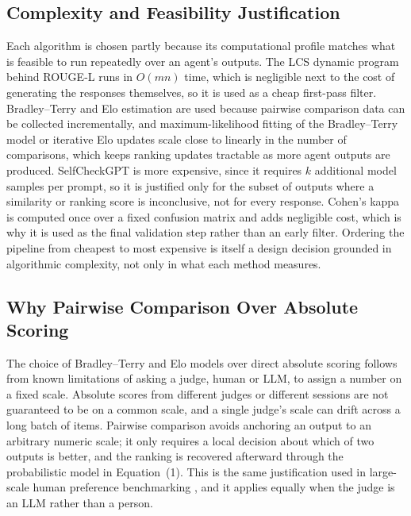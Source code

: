 \documentclass[conference]{IEEEtran}
\begin{document}
\subsection{Complexity and Feasibility Justification}
Each algorithm is chosen partly because its computational profile matches what is feasible to run repeatedly over an agent's outputs. The LCS dynamic program behind ROUGE-L runs in $O(mn)$ time, which is negligible next to the cost of generating the responses themselves, so it is used as a cheap first-pass filter. Bradley--Terry and Elo estimation are used because pairwise comparison data can be collected incrementally, and maximum-likelihood fitting of the Bradley--Terry model or iterative Elo updates scale close to linearly in the number of comparisons, which keeps ranking updates tractable as more agent outputs are produced. SelfCheckGPT is more expensive, since it requires $k$ additional model samples per prompt, so it is justified only for the subset of outputs where a similarity or ranking score is inconclusive, not for every response. Cohen's kappa is computed once over a fixed confusion matrix and adds negligible cost, which is why it is used as the final validation step rather than an early filter. Ordering the pipeline from cheapest to most expensive is itself a design decision grounded in algorithmic complexity, not only in what each method measures.

\subsection{Why Pairwise Comparison Over Absolute Scoring}
The choice of Bradley--Terry and Elo models over direct absolute scoring follows from known limitations of asking a judge, human or LLM, to assign a number on a fixed scale. Absolute scores from different judges or different sessions are not guaranteed to be on a common scale, and a single judge's scale can drift across a long batch of items. Pairwise comparison avoids anchoring an output to an arbitrary numeric scale; it only requires a local decision about which of two outputs is better, and the ranking is recovered afterward through the probabilistic model in Equation~(1). This is the same justification used in large-scale human preference benchmarking \cite{zheng2023judging}, and it applies equally when the judge is an LLM rather than a person.
\end{document}
